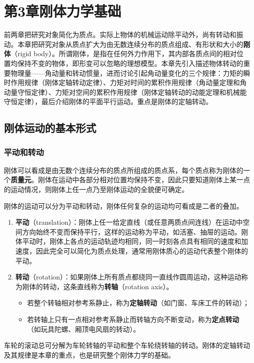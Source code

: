 \chapter{第3章\texorpdfstring{\hspace{0.5em}}{ }刚体力学基础}

前两章把研究对象简化为质点。实际上物体的机械运动除平动外，尚有转动和振动。本章把研究对象从质点扩大为由无数连续分布的质点组成、有形状和大小的\textbf{刚体}（rigid body）。所谓刚体，是指在任何外力作用下，其内部各质点间的相对位置均保持不变的物体，即形变可以忽略的理想模型。本章先引入描述物体转动的重要物理量——角动量和转动惯量，进而讨论引起角动量变化的三个规律：力矩的瞬时作用规律（刚体定轴转动定律）、力矩对时间的累积作用规律（角动量定理和角动量守恒定律）、力矩对空间的累积作用规律（刚体定轴转动的动能定理和机械能守恒定律），最后介绍刚体的平面平行运动。重点是刚体的定轴转动。

\section{刚体运动的基本形式}
    \subsection{平动和转动}
    刚体可以看成是由无数个连续分布的质点所组成的质点系，每个质点称为刚体的一个\textbf{质量元}。刚体在运动中各部分相对位置均保持不变，因此只要知道刚体上某一点的运动情况，则刚体上任一点乃至刚体运动的全貌便可确定。

    刚体的运动可以分为平动和转动，刚体任何复杂的运动均可看成是二者的叠加。
    \begin{enumerate}
        \item \textbf{平动}（translation）：刚体上任一给定直线（或任意两质点间连线）在运动中空间方向始终不变而保持平行，这样的运动称为平动，如活塞、抽屉的运动。刚体平动时，刚体上各点的运动轨迹均相同，同一时刻各点具有相同的速度和加速度，因此完全可以简化为质点处理，通常用刚体质心的运动代表整个刚体的平动。
        \item \textbf{转动}（rotation）：如果刚体上所有质点都绕同一直线作圆周运动，这种运动称为刚体的转动，这条直线称为\textbf{转轴}（rotation axis）。
        \begin{itemize}
            \item 若整个转轴相对参考系静止，称为\textbf{定轴转动}（如门窗、车床工件的转动）；
            \item 若转轴上只有一点相对参考系静止而转轴方向不断变动，称为\textbf{定点转动}（如玩具陀螺、厢顶电风扇的转动）。
        \end{itemize}
    \end{enumerate}
    车轮的滚动总可分解为车轮转轴的平动和整个车轮绕转轴的转动。刚体的定轴转动及其规律是本章的重点，也是研究整个刚体力学的基础。

